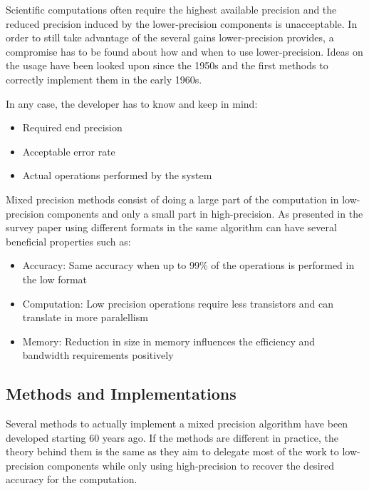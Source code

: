 Scientific computations often require the highest available precision and the reduced precision induced by the lower-precision components is unacceptable. In order to still take advantage of the several gains lower-precision provides, a compromise has to be found about how and when to use lower-precision. Ideas on the usage have been looked upon since the 1950s and the first methods to correctly implement them in the early 1960s.

In any case, the developer has to know and keep in mind:
\begin{itemize}
  \item Required end precision
  \item Acceptable error rate
  \item Actual operations performed by the system
\end{itemize}

Mixed precision methods consist of doing a large part of the computation in low-precision components and only a small part in high-precision. As presented in the survey paper \cite{Goddeke2007} using different formats in the same algorithm can have several beneficial properties such as:
\begin{itemize}
  \item Accuracy: Same accuracy when up to 99\% of the operations is performed in the low format
  \item Computation: Low precision operations require less transistors and can translate in more paralellism
  \item Memory: Reduction in size in memory influences the efficiency and bandwidth requirements positively
\end{itemize}


\subsection{Methods and Implementations}
Several methods to actually implement a mixed precision algorithm have been developed starting 60 years ago. If the methods are different in practice, the theory behind them is the same as they aim to delegate most of the work to low-precision components while only using high-precision to recover the desired accuracy for the computation.


